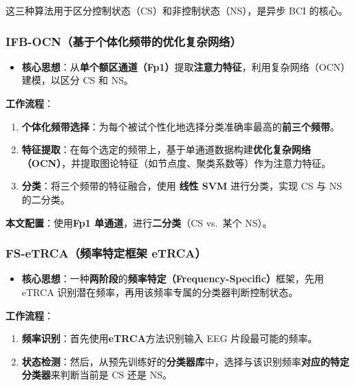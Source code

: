 \documentclass[12pt, a4paper]{ctexart}
\begin{document}
这三种算法用于区分控制状态（CS）和非控制状态（NS），是异步 BCI 的核心。

\subsubsection*{IFB-OCN（基于个体化频带的优化复杂网络）}

\begin{itemize}
  \item \textbf{核心思想}：从\textbf{单个额区通道（Fp1）}提取\textbf{注意力特征}，利用复杂网络（OCN）建模，以区分 CS 和 NS。
\end{itemize}

\textbf{工作流程}：

\begin{enumerate}
  \item \textbf{个体化频带选择}：为每个被试个性化地选择分类准确率最高的\textbf{前三个频带}。
  \item \textbf{特征提取}：在每个选定的频带上，基于单通道数据构建\textbf{优化复杂网络（OCN）}，并提取图论特征（如节点度、聚类系数等）作为注意力特征。
  \item \textbf{分类}：将三个频带的特征融合，使用 \textbf{线性 SVM} 进行分类，实现 CS 与 NS 的二分类。
\end{enumerate}

\textbf{本文配置}：使用\textbf{Fp1 单通道}，进行\textbf{二分类}（CS vs.\ 某个 NS）。

\subsubsection*{FS-eTRCA（频率特定框架 eTRCA）}

\begin{itemize}
  \item \textbf{核心思想}：一种\textbf{两阶段}的\textbf{频率特定（Frequency-Specific）}框架，先用 eTRCA 识别潜在频率，再用该频率专属的分类器判断控制状态。
\end{itemize}

\textbf{工作流程}：

\begin{enumerate}
  \item \textbf{频率识别}：首先使用\textbf{eTRCA}方法识别输入 EEG 片段最可能的频率。
  \item \textbf{状态检测}：然后，从预先训练好的\textbf{分类器库}中，选择与该识别频率\textbf{对应的特定分类器}来判断当前是 CS 还是 NS。
\end{enumerate}
\end{document}
